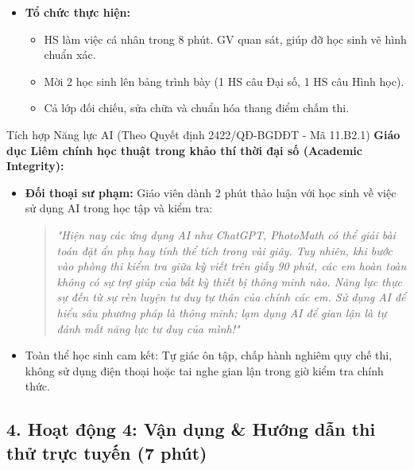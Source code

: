 \documentclass[12pt, a4paper]{article}
\begin{document}
\begin{itemize}[leftmargin=1.2cm]
    \item[d)] \textbf{Tổ chức thực hiện:}
    \begin{itemize}[leftmargin=0.6cm]
        \item HS làm việc cá nhân trong 8 phút. GV quan sát, giúp đỡ học sinh vẽ hình chuẩn xác.
        \item Mời 2 học sinh lên bảng trình bày (1 HS câu Đại số, 1 HS câu Hình học).
        \item Cả lớp đối chiếu, sửa chữa và chuẩn hóa thang điểm chấm thi.
    \end{itemize}
\end{itemize}

\begin{aibox}{Tích hợp Năng lực AI (Theo Quyết định 2422/QĐ-BGDĐT - Mã 11.B2.1)}
    \textbf{Giáo dục Liêm chính học thuật trong khảo thí thời đại số (Academic Integrity):}
    \begin{itemize}[leftmargin=0.6cm]
        \item \textbf{Đối thoại sư phạm:} Giáo viên dành 2 phút thảo luận với học sinh về việc sử dụng AI trong học tập và kiểm tra:
        \begin{quote}
            \textit{"Hiện nay các ứng dụng AI như ChatGPT, PhotoMath có thể giải bài toán đặt ẩn phụ hay tính thể tích trong vài giây. Tuy nhiên, khi bước vào phòng thi kiểm tra giữa kỳ viết trên giấy 90 phút, các em hoàn toàn không có sự trợ giúp của bất kỳ thiết bị thông minh nào. Năng lực thực sự đến từ sự rèn luyện tư duy tự thân của chính các em. Sử dụng AI để hiểu sâu phương pháp là thông minh; lạm dụng AI để gian lận là tự đánh mất năng lực tư duy của mình!"}
        \end{quote}
        \item Toàn thể học sinh cam kết: Tự giác ôn tập, chấp hành nghiêm quy chế thi, không sử dụng điện thoại hoặc tai nghe gian lận trong giờ kiểm tra chính thức.
    \end{itemize}
\end{aibox}

\subsection*{4. Hoạt động 4: Vận dụng & Hướng dẫn thi thử trực tuyến (7 phút)}
\end{document}
